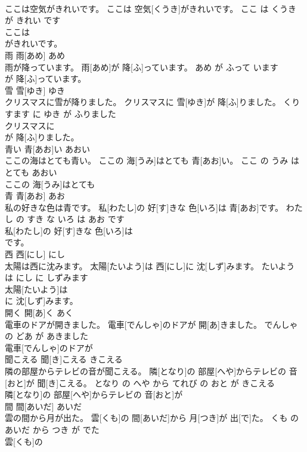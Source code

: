 \documentclass[8pt]{extreport}
\begin{document}
\begin{CJK}{UTF8}{min}
\\	ここは空気がきれいです。	ここは 空気[くうき]がきれいです。	ここ は くうき が きれい です	
\\	ここは
\\	がきれいです。			
\\	雨	雨[あめ]	あめ	
\\	雨が降っています。	雨[あめ]が 降[ふ]っています。	あめ が ふって います	
\\	が 降[ふ]っています。			
\\	雪	雪[ゆき]	ゆき	
\\	クリスマスに雪が降りました。	クリスマスに 雪[ゆき]が 降[ふ]りました。	くりすます に ゆき が ふりました	
\\	クリスマスに
\\	が 降[ふ]りました。			
\\	青い	青[あお]い	あおい	
\\	ここの海はとても青い。	ここの 海[うみ]はとても 青[あお]い。	ここ の うみ は とても あおい	
\\	ここの 海[うみ]はとても
\\	青	青[あお]	あお	
\\	私の好きな色は青です。	私[わたし]の 好[す]きな 色[いろ]は 青[あお]です。	わたし の すき な いろ は あお です	
\\	私[わたし]の 好[す]きな 色[いろ]は
\\	です。			
\\	西	西[にし]	にし	
\\	太陽は西に沈みます。	太陽[たいよう]は 西[にし]に 沈[しず]みます。	たいよう は にし に しずみます	
\\	太陽[たいよう]は
\\	に 沈[しず]みます。			
\\	開く	開[あ]く	あく	
\\	電車のドアが開きました。	電車[でんしゃ]のドアが 開[あ]きました。	でんしゃ の どあ が あきました	
\\	電車[でんしゃ]のドアが
\\	聞こえる	聞[き]こえる	きこえる	
\\	隣の部屋からテレビの音が聞こえる。	隣[となり]の 部屋[へや]からテレビの 音[おと]が 聞[き]こえる。	となり の へや から てれび の おと が きこえる	
\\	隣[となり]の 部屋[へや]からテレビの 音[おと]が
\\	間	間[あいだ]	あいだ	
\\	雲の間から月が出た。	雲[くも]の 間[あいだ]から 月[つき]が 出[で]た。	くも の あいだ から つき が でた	
\\	雲[くも]の

\end{CJK}
\end{document}
